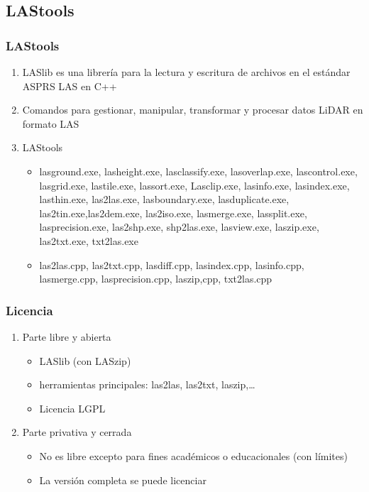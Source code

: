 \subsection{LAStools}
\begin{frame}
  \frametitle{LAStools}
  \begin{enumerate}
    \item LASlib es una librería para la \alert{lectura} y \alert{escritura} de archivos en el
      estándar ASPRS LAS en C++
    \item Comandos para gestionar, manipular, transformar y procesar datos LiDAR
      en formato LAS
    \item \alert{LAStools}
      \begin{itemize}
        \item lasground.exe, lasheight.exe, lasclassify.exe, lasoverlap.exe,
          lascontrol.exe, lasgrid.exe, lastile.exe, lassort.exe, Lasclip.exe,
          lasinfo.exe, lasindex.exe, lasthin.exe, las2las.exe, lasboundary.exe,
          lasduplicate.exe, las2tin.exe,las2dem.exe, las2iso.exe, lasmerge.exe,
          lassplit.exe, lasprecision.exe, las2shp.exe, shp2las.exe, lasview.exe,
          laszip.exe, las2txt.exe, txt2las.exe
        \item las2las.cpp, las2txt.cpp, lasdiff.cpp, lasindex.cpp, lasinfo.cpp,
          lasmerge.cpp, lasprecision.cpp, laszip,cpp, txt2las.cpp
      \end{itemize}
  \end{enumerate}
\end{frame}
\begin{frame}
  \frametitle{Licencia}
  \begin{enumerate}
    \item Parte libre y abierta
      \begin{itemize}
        \item LASlib (con LASzip)
        \item herramientas principales: las2las, las2txt, laszip,\ldots
        \item Licencia \alert{LGPL}
      \end{itemize}
    \item Parte privativa y cerrada
      \begin{itemize}
        \item No es libre excepto para fines académicos o educacionales (con
          límites)
        \item La versión completa se puede licenciar
      \end{itemize}
  \end{enumerate}
\end{frame}

